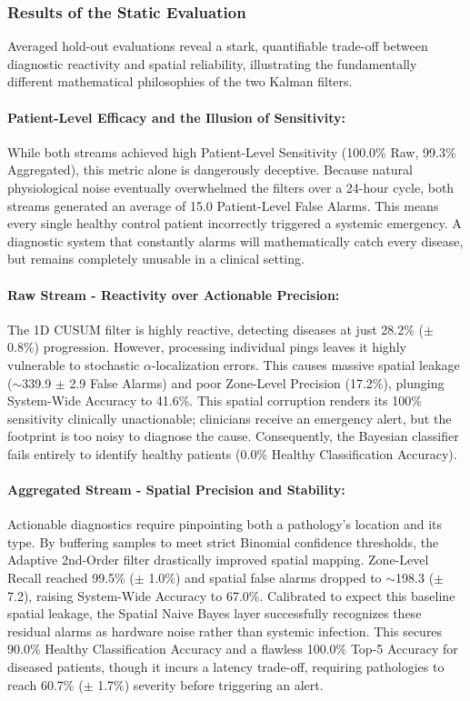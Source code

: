 \documentclass[sigconf]{acmart}
\begin{document}
\subsubsection{Results of the Static Evaluation}
Averaged hold-out evaluations reveal a stark, quantifiable trade-off between diagnostic reactivity and spatial reliability, illustrating the fundamentally different mathematical philosophies of the two Kalman filters.

\paragraph{Patient-Level Efficacy and the Illusion of Sensitivity:}
While both streams achieved high Patient-Level Sensitivity (100.0\% Raw, 99.3\% Aggregated), this metric alone is dangerously deceptive. Because natural physiological noise eventually overwhelmed the filters over a 24-hour cycle, both streams generated an average of 15.0 Patient-Level False Alarms. This means every single healthy control patient incorrectly triggered a systemic emergency. A diagnostic system that constantly alarms will mathematically catch every disease, but remains completely unusable in a clinical setting.

\paragraph{Raw Stream - Reactivity over Actionable Precision:}
The 1D CUSUM filter is highly reactive, detecting diseases at just 28.2\% ($\pm$ 0.8\%) progression. However, processing individual pings leaves it highly vulnerable to stochastic $\alpha$-localization errors. This causes massive spatial leakage ($\sim$339.9 $\pm$ 2.9 False Alarms) and poor Zone-Level Precision (17.2\%), plunging System-Wide Accuracy to 41.6\%. This spatial corruption renders its 100\% sensitivity clinically unactionable; clinicians receive an emergency alert, but the footprint is too noisy to diagnose the cause. Consequently, the Bayesian classifier fails entirely to identify healthy patients (0.0\% Healthy Classification Accuracy).

\paragraph{Aggregated Stream - Spatial Precision and Stability:} Actionable diagnostics require pinpointing both a pathology's location and its type. By buffering samples to meet strict Binomial confidence thresholds, the Adaptive 2nd-Order filter drastically improved spatial mapping. Zone-Level Recall reached 99.5\% ($\pm$ 1.0\%) and spatial false alarms dropped to $\sim$198.3 ($\pm$ 7.2), raising System-Wide Accuracy to 67.0\%. Calibrated to expect this baseline spatial leakage, the Spatial Naive Bayes layer successfully recognizes these residual alarms as hardware noise rather than systemic infection. This secures 90.0\% Healthy Classification Accuracy and a flawless 100.0\% Top-5 Accuracy for diseased patients, though it incurs a latency trade-off, requiring pathologies to reach 60.7\% ($\pm$ 1.7\%) severity before triggering an alert.
\end{document}
